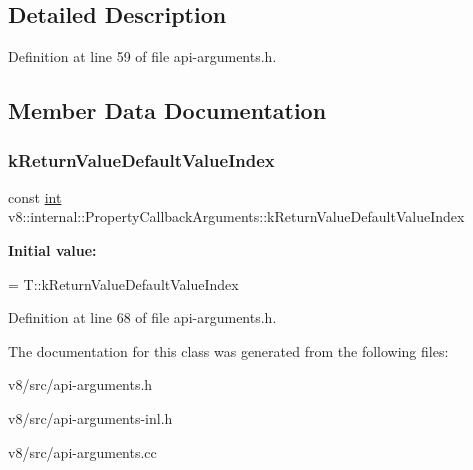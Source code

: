 \subsection{Detailed Description}


Definition at line 59 of file api-\/arguments.\+h.



\subsection{Member Data Documentation}
\mbox{\label{classv8_1_1internal_1_1PropertyCallbackArguments_af4efd2b3fe140e2f70f82a004ea9cd4a}} 
\subsubsection{\texorpdfstring{k\+Return\+Value\+Default\+Value\+Index}{kReturnValueDefaultValueIndex}}
{\footnotesize\ttfamily const \mbox{\hyperlink{classint}{int}} v8\+::internal\+::\+Property\+Callback\+Arguments\+::k\+Return\+Value\+Default\+Value\+Index\hspace{0.3cm}{\ttfamily [static]}}

{\bfseries Initial value\+:}
\begin{DoxyCode}
=
      T::kReturnValueDefaultValueIndex
\end{DoxyCode}


Definition at line 68 of file api-\/arguments.\+h.



The documentation for this class was generated from the following files\+:\begin{DoxyCompactItemize}
\item 
v8/src/api-\/arguments.\+h\item 
v8/src/api-\/arguments-\/inl.\+h\item 
v8/src/api-\/arguments.\+cc\end{DoxyCompactItemize}
